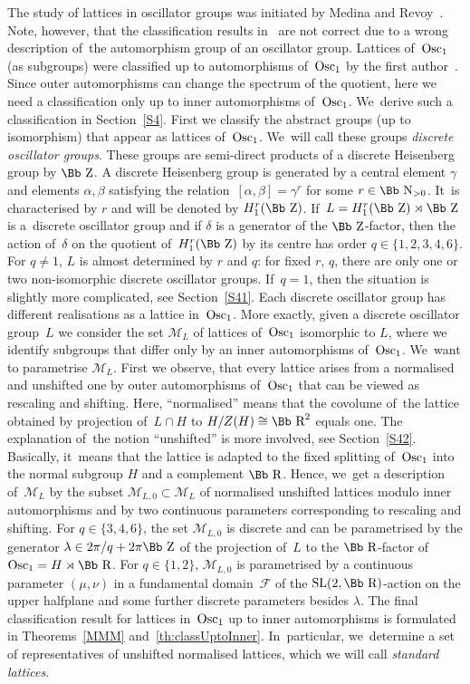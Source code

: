 \documentclass[pdftex]{sigma}
\newcommand\RR{{\mbox{\Bb R}}}
\newcommand\NN{{\mbox{\Bb N}}}
\newcommand\ZZ{{\mbox{\Bb Z}}}
\newcommand\cM{{\mathcal M}}
\newcommand\cF{{\mathcal F}}
\newcommand{\SL}{\mathop{{\rm SL}}}
\newcommand{\Osc}{{\rm Osc}}
\numberwithin{equation}{section}
\begin{document}
 The study of lattices in oscillator groups was initiated by Medina and Revoy~\cite{MR}. Note, how\-ever, that the classification results in~\cite{MR} are not correct due to a wrong description of~the automorphism group of an oscillator group. Lattices of~$\Osc_1$ (as subgroups) were classified up to automorphisms of~$\Osc_1$ by the first author~\cite{F}. Since outer automorphisms can change the spectrum of the quotient, here we need a classification only up to inner automorphisms of~$\Osc_1$. We~derive such a classification in Section~\ref{S4}. First we classify the abstract groups (up to isomorphism) that appear as lattices of~$\Osc_1$. We~will call these groups {\it discrete oscillator groups}. These groups are semi-direct products of a discrete Heisenberg group by $\ZZ$. A discrete Heisenberg group is generated by a central element $\gamma$ and elements $\alpha,\beta$ satisfying the relation~$[\alpha,\beta]=\gamma^r$ for some $r\in\NN_{>0}$. It~is characterised by $r$ and will be denoted by $H_1^r(\ZZ)$. If~$L=H_1^r(\ZZ)\rtimes \ZZ$ is a~discrete oscillator group and if $\delta$ is a generator of the $\ZZ$-factor, then the action of~$\delta$ on the quotient of~$H_1^r(\ZZ)$ by its centre has order $q\in\{1,2,3,4,6\}$. For $q\not=1$, $L$ is almost determined by $r$ and $q$: for fixed $r$, $q$, there are only one or two non-isomorphic discrete oscillator groups. If~$q=1$, then the situation is slightly more complicated, see Section~\ref{S41}. Each discrete oscillator group has different realisations as a lattice in~$\Osc_1$. More exactly, given a discrete oscillator group~$L$ we consider the set $\cM_L$ of lattices of~$\Osc_1$ isomorphic to $L$, where we identify subgroups that differ only by an inner automorphisms of~$\Osc_1$. We~want to parametrise $\cM_L$. First we observe, that every lattice arises from a normalised and unshifted one by outer automorphisms of~$\Osc_1$ that can be viewed as rescaling and shifting. Here, ``normalised'' means that the covolume of~the lattice obtained by projection of~$L\cap H$ to $H/Z(H)\cong \RR^2$ equals one. The explanation of~the notion ``unshifted'' is more involved, see Section~\ref{S42}. Basically, it~means that the lattice is adapted to the fixed splitting of~$\Osc_1$ into the normal subgroup $H$ and a complement $\RR$. Hence, we~get a description of~$\cM_L$ by the subset $\cM_{L,0}\subset \cM_L$ of normalised unshifted lattices modulo inner automorphisms and by two continuous parameters corresponding to rescaling and shifting. For $q\in\{3,4,6\}$, the set $\cM_{L,0}$ is discrete and can be parametrised by the generator $\lambda\in 2\pi/q +2\pi\ZZ$ of the projection of~$L$ to the $\RR$-factor of~$\Osc_1=H\rtimes \RR$. For $q\in\{1,2\}$, $\cM_{L,0}$ is parametrised by a continuous parameter $(\mu,\nu)$ in a fundamental domain~$\cF$ of the $\SL(2,\RR)$-action on the upper halfplane and some further discrete parameters besides $\lambda$. The final classification result for lattices in~$\Osc_1$ up to inner automorphisms is formulated in Theorems~\ref{MMM} and~\ref{th:classUptoInner}. In~particular, we~determine a set of representatives of unshifted normalised lattices, which we will call {\it standard lattices}.
\end{document}
